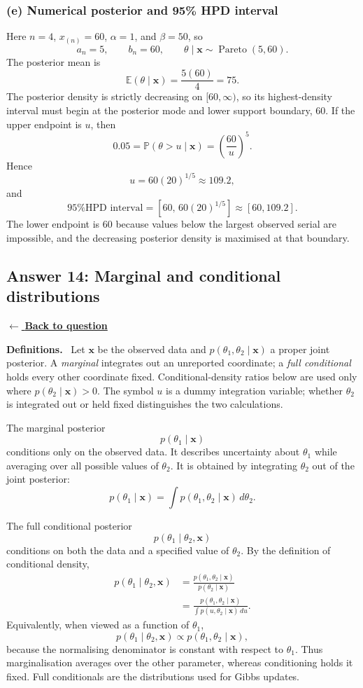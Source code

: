 \documentclass[11pt,a4paper]{article}
\newcommand{\given}{\mathrel{|}}
\newcommand{\xvec}{\boldsymbol{x}}
\newcommand{\E}{\mathbb{E}}
\newcommand{\answernav}[1]{%
  \label{answer:#1}%
  \noindent\hyperref[question:#1]{$\leftarrow$ \textbf{Back to question}}%
  \par\smallskip}
\newcommand{\studyheading}[1]{%
  \par\medskip\noindent\textcolor{statblue}{\textbf{#1.}}\ }
\begin{document}
\subsubsection*{(e) Numerical posterior and 95\% HPD interval}

Here $n=4$, $x_{(n)}=60$, $\alpha=1$, and $\beta=50$, so
\[
a_n=5,
\qquad
b_n=60,
\qquad
\theta\mid\xvec\sim\operatorname{Pareto}(5,60).
\]
The posterior mean is
\[
\boxed{
\E(\theta\mid\xvec)=\frac{5(60)}{4}=75.
}
\]
The posterior density is strictly decreasing on $[60,\infty)$, so its
highest-density interval must begin at the posterior mode and lower support
boundary, $60$. If the upper endpoint is $u$, then
\[
0.05
=\mathbb{P}(\theta>u\mid\xvec)
=\left(\frac{60}{u}\right)^5.
\]
Hence
\[
u=60(20)^{1/5}\approx109.2,
\]
and
\[
\boxed{
\text{95\% HPD interval}
=\left[60,\,60(20)^{1/5}\right]
\approx[60,109.2].
}
\]
The lower endpoint is $60$ because values below the largest observed serial
are impossible, and the decreasing posterior density is maximised at that
boundary.

\clearpage

\subsection{Answer 14: Marginal and conditional distributions}
\answernav{14}

\studyheading{Definitions}
Let $\xvec$ be the observed data and $p(\theta_1,\theta_2\given\xvec)$ a proper joint posterior.
A \emph{marginal} integrates out an unreported coordinate; a \emph{full conditional} holds every other coordinate fixed.
Conditional-density ratios below are used only where $p(\theta_2\given\xvec)>0$.
The symbol $u$ is a dummy integration variable; whether $\theta_2$ is integrated out or held fixed distinguishes the two calculations.

The marginal posterior
\[
p(\theta_1\mid\xvec)
\]
conditions only on the observed data. It describes uncertainty about
$\theta_1$ while averaging over all possible values of $\theta_2$. It is
obtained by integrating $\theta_2$ out of the joint posterior:
\[
\boxed{
p(\theta_1\mid\xvec)
=\int p(\theta_1,\theta_2\mid\xvec)\,d\theta_2.
}
\]

The full conditional posterior
\[
p(\theta_1\mid\theta_2,\xvec)
\]
conditions on both the data and a specified value of $\theta_2$. By the
definition of conditional density,
\begin{align*}
p(\theta_1\mid\theta_2,\xvec)
&=\frac{p(\theta_1,\theta_2\mid\xvec)}
{p(\theta_2\mid\xvec)}\\
&=\boxed{
\frac{p(\theta_1,\theta_2\mid\xvec)}
{\int p(u,\theta_2\mid\xvec)\,du}
}.
\end{align*}
Equivalently, when viewed as a function of $\theta_1$,
\[
p(\theta_1\mid\theta_2,\xvec)
\propto p(\theta_1,\theta_2\mid\xvec),
\]
because the normalising denominator is constant with respect to $\theta_1$.
Thus marginalisation averages over the other parameter, whereas conditioning
holds it fixed. Full conditionals are the distributions used for Gibbs
updates.
\end{document}
